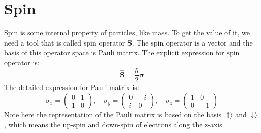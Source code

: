 \documentclass[../main.tex]{subfiles}
\begin{document}
\section{\textbf{Spin}}
Spin is some internal property of particles, like mass.
To get the value of it, we need a tool that is called spin operator $\bm{S}$. The spin operator is a vector and 
the basis of this operator space is Pauli matrix. The explicit expression for spin operator is:
\begin{equation}
    \hat{\bm{S}} = \frac{\hbar}{2}\bm{\sigma}
\end{equation}
The detailed expression for Pauli matrix is:
\begin{equation}
    \sigma_x = \begin{pmatrix} 0 & 1 \\ 1 & 0 \end{pmatrix}, \quad \sigma_y = \begin{pmatrix} 0 & -i \\ i & 0 \end{pmatrix}, \quad \sigma_z = \begin{pmatrix} 1 & 0 \\ 0 & -1 \end{pmatrix}
\end{equation}
Note here the representation of the Pauli matrix is based on the basis $\ket{\uparrow}$ and $\ket{\downarrow}$, which means the 
up-spin and down-spin of electrons along the z-axis. 
\end{document}

